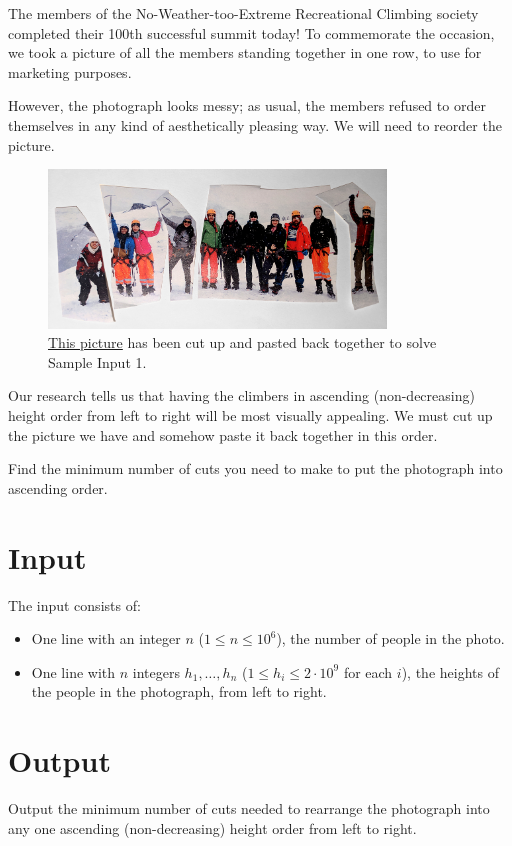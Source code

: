 
The members of the No-Weather-too-Extreme Recreational Climbing society
completed their 100th successful summit today!
To commemorate the occasion, we took a picture of all the members standing
together in one row, to use for marketing purposes.

However, the photograph looks messy; as usual, the members refused to order
themselves in any kind of aesthetically pleasing way.
We will need to reorder the picture.

\begin{figure}[h!]
\centering
\includegraphics[width=0.8\textwidth]{climbers.jpg}
\caption{\href{https://www.pexels.com/photo/men-and-women-at-the-mountain-covered-with-snow-671912/}{This picture}
         has been cut up and pasted back together to solve Sample Input 1.}%
\end{figure}

Our research tells us that having the climbers in ascending (non-decreasing)
height order from left to right will be most visually appealing.
We must cut up the picture we have and somehow paste it back together in this
order.

Find the minimum number of cuts you need to make to put the photograph into
ascending order.

\section*{Input}

The input consists of:
\begin{itemize}
\item One line with an integer $n$ ($1 \leq n \leq 10^6 $), the number of people in the photo.
\item One line with $n$ integers $h_1, \ldots, h_n$ ($1 \leq h_i \leq 2 \cdot 10^9$ for each $i$), the heights of the people in the photograph, from left to right.
\end{itemize}

\section*{Output}

Output the minimum number of cuts needed to rearrange the photograph into any
one ascending (non-decreasing) height order from left to right.
